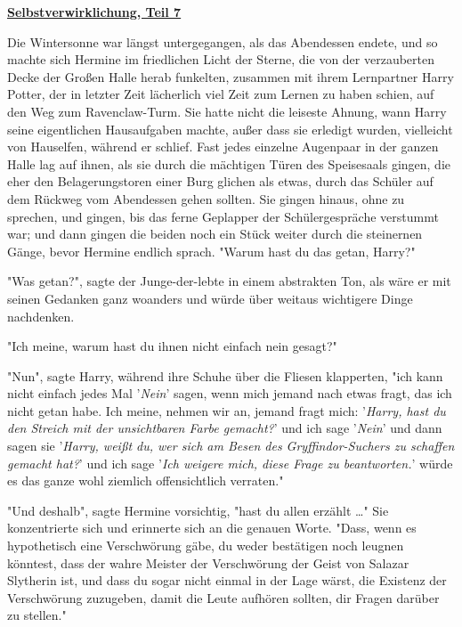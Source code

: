 

\hypertarget{selbstverwirklichung-teil-7}{%

\textbf{\uline{Selbstverwirklichung, Teil 7}}

Die Wintersonne war längst untergegangen, als das Abendessen endete, und so machte sich Hermine im friedlichen Licht der Sterne, die von der verzauberten Decke der Großen Halle herab funkelten, zusammen mit ihrem Lernpartner Harry Potter, der in letzter Zeit lächerlich viel Zeit zum Lernen zu haben schien, auf den Weg zum Ravenclaw-Turm. Sie hatte nicht die leiseste Ahnung, wann Harry seine eigentlichen Hausaufgaben machte, außer dass sie erledigt wurden, vielleicht von Hauselfen, während er schlief. Fast jedes einzelne Augenpaar in der ganzen Halle lag auf ihnen, als sie durch die mächtigen Türen des Speisesaals gingen, die eher den Belagerungstoren einer Burg glichen als etwas, durch das Schüler auf dem Rückweg vom Abendessen gehen sollten. Sie gingen hinaus, ohne zu sprechen, und gingen, bis das ferne Geplapper der Schülergespräche verstummt war; und dann gingen die beiden noch ein Stück weiter durch die steinernen Gänge, bevor Hermine endlich sprach. "Warum hast du das getan, Harry?"

"Was getan?", sagte der Junge-der-lebte in einem abstrakten Ton, als wäre er mit seinen Gedanken ganz woanders und würde über weitaus wichtigere Dinge nachdenken.

"Ich meine, warum hast du ihnen nicht einfach nein gesagt?"

"Nun", sagte Harry, während ihre Schuhe über die Fliesen klapperten, "ich kann nicht einfach jedes Mal '\emph{Nein}' sagen, wenn mich jemand nach etwas fragt, das ich nicht getan habe. Ich meine, nehmen wir an, jemand fragt mich: '\emph{Harry, hast du den Streich mit der unsichtbaren Farbe gemacht?}' und ich sage '\emph{Nein}' und dann sagen sie '\emph{Harry, weißt du, wer sich am Besen des Gryffindor-Suchers zu schaffen gemacht hat?}' und ich sage '\emph{Ich weigere mich, diese Frage zu beantworten.}' würde es das ganze wohl ziemlich offensichtlich verraten."

"Und deshalb", sagte Hermine vorsichtig, "hast du allen erzählt …" Sie konzentrierte sich und erinnerte sich an die genauen Worte. "Dass, wenn es hypothetisch eine Verschwörung gäbe, du weder bestätigen noch leugnen könntest, dass der wahre Meister der Verschwörung der Geist von Salazar Slytherin ist, und dass du sogar nicht einmal in der Lage wärst, die Existenz der Verschwörung zuzugeben, damit die Leute aufhören sollten, dir Fragen darüber zu stellen."

}
